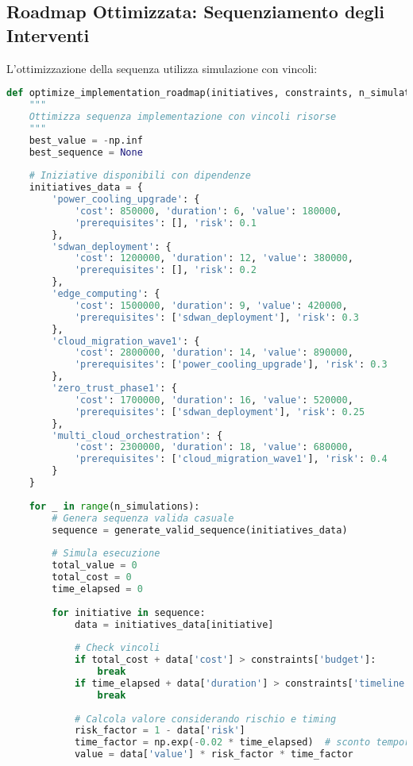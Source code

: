 \subsection{Roadmap Ottimizzata: Sequenziamento degli Interventi}

L'ottimizzazione della sequenza utilizza simulazione con vincoli:

\begin{lstlisting}[language=Python, caption=Ottimizzazione roadmap implementativa]
def optimize_implementation_roadmap(initiatives, constraints, n_simulations=10000):
    """
    Ottimizza sequenza implementazione con vincoli risorse
    """
    best_value = -np.inf
    best_sequence = None
    
    # Iniziative disponibili con dipendenze
    initiatives_data = {
        'power_cooling_upgrade': {
            'cost': 850000, 'duration': 6, 'value': 180000,
            'prerequisites': [], 'risk': 0.1
        },
        'sdwan_deployment': {
            'cost': 1200000, 'duration': 12, 'value': 380000,
            'prerequisites': [], 'risk': 0.2
        },
        'edge_computing': {
            'cost': 1500000, 'duration': 9, 'value': 420000,
            'prerequisites': ['sdwan_deployment'], 'risk': 0.3
        },
        'cloud_migration_wave1': {
            'cost': 2800000, 'duration': 14, 'value': 890000,
            'prerequisites': ['power_cooling_upgrade'], 'risk': 0.3
        },
        'zero_trust_phase1': {
            'cost': 1700000, 'duration': 16, 'value': 520000,
            'prerequisites': ['sdwan_deployment'], 'risk': 0.25
        },
        'multi_cloud_orchestration': {
            'cost': 2300000, 'duration': 18, 'value': 680000,
            'prerequisites': ['cloud_migration_wave1'], 'risk': 0.4
        }
    }
    
    for _ in range(n_simulations):
        # Genera sequenza valida casuale
        sequence = generate_valid_sequence(initiatives_data)
        
        # Simula esecuzione
        total_value = 0
        total_cost = 0
        time_elapsed = 0
        
        for initiative in sequence:
            data = initiatives_data[initiative]
            
            # Check vincoli
            if total_cost + data['cost'] > constraints['budget']:
                break
            if time_elapsed + data['duration'] > constraints['timeline']:
                break
                
            # Calcola valore considerando rischio e timing
            risk_factor = 1 - data['risk']
            time_factor = np.exp(-0.02 * time_elapsed)  # sconto temporale
            value = data['value'] * risk_factor * time_factor
            

\end{lstlisting}
